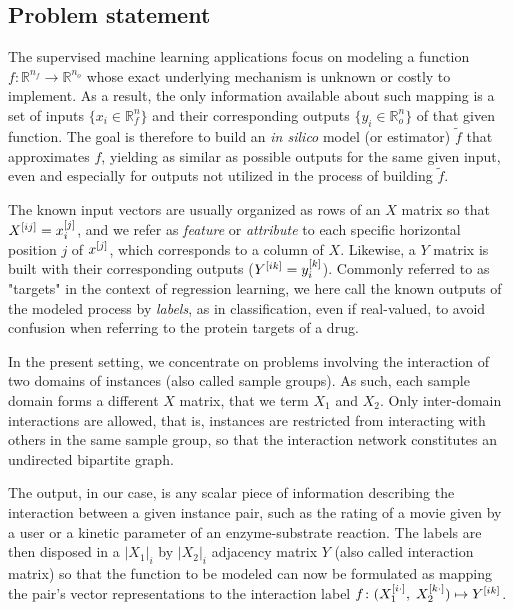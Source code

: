 \subsection{Problem statement}
\label{sec:problem_statement}

The supervised machine learning applications focus on modeling a function $f
\colon \mathbb{R}^{n_f} \to \mathbb{R}^{n_o}$ whose exact underlying mechanism
is unknown or costly to implement. As a result, the only information available
about such mapping is a set of inputs $\{x_i \in \mathbb R^n_f\}$ and their
corresponding outputs $\{y_i \in \mathbb R^n_o\}$ of that given function. The
goal is therefore to build an \textit{in silico} model (or estimator) $\tilde f$
that approximates $f$, yielding as similar as possible outputs for the same
given input, even and especially for outputs not utilized in the process of
building $\tilde f$.


The known input vectors are usually organized as rows of an $X$ matrix so that
$X^{[ij]} = x_i^{[j]}$, and we refer as \emph{feature} or \emph{attribute} to
each specific horizontal position $j$ of $x^{[j]}$, which corresponds to a column
of $X$. Likewise, a $Y$ matrix is built with their corresponding outputs
($Y^{[ik]} = y_i^{[k]}$). Commonly referred to as "targets" in the context of
regression learning, we here call the known outputs of the modeled process by
\emph{labels}, as in classification, even if real-valued, to avoid confusion
when referring to the protein targets of a drug.

In the present setting, we concentrate on problems involving the interaction of
two domains of instances (also called sample groups). As such, each sample
domain forms a different $X$ matrix, that we term $X_1$ and $X_2$. Only
inter-domain interactions are allowed, that is, instances are restricted from
interacting with others in the same sample group, so that the interaction
network constitutes an undirected bipartite graph.

The output, in our case, is any scalar piece of information describing the
interaction between a given instance pair, such as the rating of a movie given
by a user or a kinetic parameter of an enzyme-substrate reaction. The labels are
then disposed in a $|X_1|_i$ by $|X_2|_i$ adjacency matrix $Y$ (also called
interaction matrix) so that the function to be modeled can now be formulated as
mapping the pair's vector representations to the interaction label $f\colon
(X_1^{[i\cdot]},\; X_2^{[k\cdot]}) \mapsto Y^{[ik]}$.

